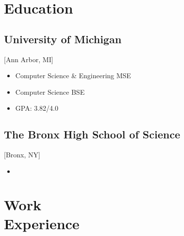 \documentclass{mycv}
\begin{document}
\maketitle%

\section{Education}


\subsection{University of Michigan}[Ann Arbor, MI]
\vspace{-\parskip}%
\begin{itemize}[label={}]
  \item Computer Science \& Engineering MSE \\
  \item Computer Science BSE 
  \item GPA: 3.82/4.0
\end{itemize}

\subsection{The Bronx High School of Science}[Bronx, NY]
\vspace{-\parskip}%
\begin{itemize}[label={}]
  \item {}
\end{itemize}

\section{Work\\Experience}
\end{document}
